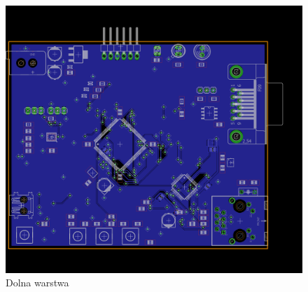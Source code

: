 \documentclass[12pt]{article}
\begin{document}
\begin{figure}[H]
\begin{center}
\includegraphics[width=1\textwidth]{figures/bottom.png}
\caption{Dolna warstwa}
\end{center}
\end{figure}
\end{document}
